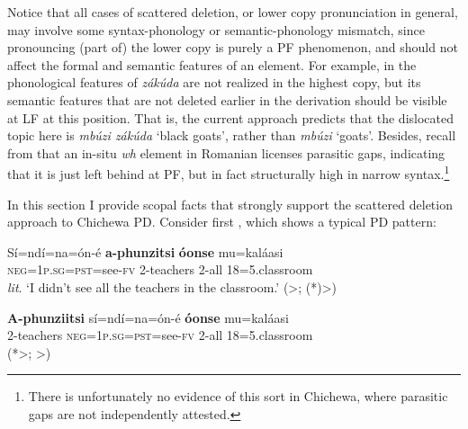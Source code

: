 \documentclass[output=paper,colorlinks,citecolor=brown
]{langscibook}
\begin{document}
\label{ex:chen:PDex1}\z
{}\z

 Notice that all cases of scattered deletion, or lower copy pronunciation in general, may involve some syntax-phonology or semantic-phonology mismatch, since pronouncing (part of) the lower copy is purely a PF phenomenon, and should not affect the formal and semantic features of an element. For example, in  the phonological features of \textit{z\'{a}k\'{u}da} are not realized in the highest copy, but its semantic features that are not deleted earlier in the derivation should be visible at LF at this position. That is, the current approach predicts that the dislocated topic here is \textit{mb\'{u}zi z\'{a}k\'{u}da} `black goats', rather than \textit{mb\'{u}zi} `goats'. Besides, recall from  that an in-situ \textit{wh} element in Romanian licenses parasitic gaps, indicating that it is just left behind at PF, but in fact structurally high in narrow syntax.\footnote{There is unfortunately no evidence of this sort in Chichewa, where parasitic gaps are not independently attested.}

In this section I provide scopal facts that strongly support the scattered deletion approach to Chichewa PD. Consider first , which shows a typical PD pattern:

\ea\label{ex:chen:scope}
\begin{xlist}
  \ex
  {\gll S\'{i}=nd\'{i}=na=\'{o}n-\'{e} \textbf{a-phunzitsi} \textbf{\'{o}onse} mu=kal\'{a}asi\\
  \textsc{neg}=1\textsc{p.sg}=\textsc{pst}=see-\textsc{fv} 2-teachers 2-all 18=5.classroom\\
  \glt \textit{lit}. `I didn't see all the teachers in the classroom.' \hfill{(\neg>\forall; (*)\forall>\neg)}}\label{ex:chen:scope1}

  \ex
  {\gll \textbf{A-phunziitsi} s\'{i}=nd\'{i}=na=\'{o}n-\'{e} \textbf{\'{o}onse} mu=kal\'{a}asi\\
  2-teachers \textsc{neg}=1\textsc{p.sg}=\textsc{pst}=see-\textsc{fv} 2-all 18=5.classroom\\}\label{ex:chen:scope2}\hfill (*\neg>\forall; \forall>\neg)
\end{xlist}
\z
\end{document}
